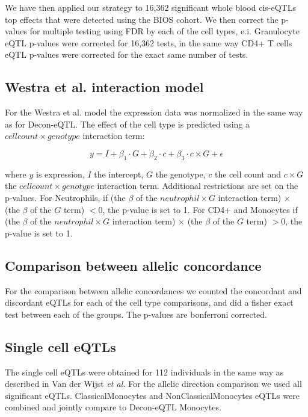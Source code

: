 We have then applied our strategy to 16,362 significant whole blood cis-eQTLs top effects that were detected using the BIOS cohort. We then correct the p-values for multiple testing using FDR by each of the cell types, e.i. Granulocyte eQTL p-values were corrected for 16,362 tests, in the same way CD4+ T cells eQTL p-values were corrected for the exact same number of tests.

\subsection{Westra et al. interaction model}
For the Westra et al. model the expression data was normalized in the same way as for Decon-eQTL. The effect of the cell type is predicted using a $cell count \times genotype$ interaction term:

\begin{equation}
y = I + \beta_{1} \cdot G + \beta_{2} \cdot c + \beta_{3} \cdot c \times G + \epsilon 
\end{equation}

where $y$ is expression, $I$ the intercept, $G$ the genotype,  $c$ the cell count and $c \times G$ the $cell count \times genotype$ interaction term. Additional restrictions are set on the p-values. For Neutrophils, if (the $\beta$ of the $neutrophil \times G$ interaction term) $\times$ (the $\beta$ of the $G$ term) $< 0$, the p-value is set to 1. For CD4+ and Monocytes if (the $\beta$ of the $neutrophil \times G$ interaction term) $\times$ (the $\beta$ of the $G$ term) $> 0$, the p-value is set to 1.

\subsection{Comparison between allelic concordance}
For the comparison between allelic concordances we counted the concordant and discordant eQTLs for each of the cell type comparisons, and did a fisher exact test between each of the groups. The p-values are bonferroni corrected.

\subsection{Single cell eQTLs}
The single cell eQTLs were obtained for 112 individuals in the same way as described in Van der Wijst \textit{et al.}\cite{wijstSinglecellRNASequencing2018} For the allelic direction comparison we used all significant eQTLs. ClassicalMonocytes and NonClassicalMonocytes eQTLs were combined and jointly compare to Decon-eQTL Monocytes. 

